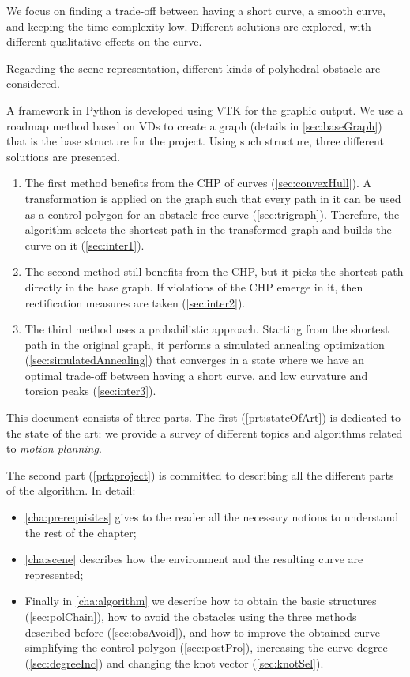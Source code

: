 \documentclass[dissertation.tex]{subfiles}
\begin{document}
We focus on finding a trade-off between having a short curve, a
smooth curve, and keeping the time complexity low.
Different solutions are explored, with different qualitative effects
on the curve.

Regarding the scene representation, different kinds of
polyhedral obstacle are considered.

A framework in Python is developed using \acf{VTK} for the graphic
output. We use a roadmap method based on \acfp{VD} to create a
graph (details in
\cref{sec:baseGraph}) that is the base
structure for the project. Using such structure, three
different solutions are presented.
\begin{enumerate}
\item The first method benefits from the \acf{CHP} of \bs
  curves (\cref{sec:convexHull}). A transformation is applied on the
  graph such that every path in it can be used as a control polygon
  for an obstacle-free curve (\cref{sec:trigraph}). Therefore, the
  algorithm selects the shortest path in the transformed graph and
  builds the curve on it (\cref{sec:inter1}).
\item The second method still benefits from the \ac{CHP},
  but it picks the shortest path directly in the base graph. If
  violations of the \ac{CHP} emerge in it, then rectification
  measures are taken (\cref{sec:inter2}).
\item The third method uses a probabilistic approach. Starting from
  the shortest path in the original graph, it performs a simulated
  annealing optimization (\cref{sec:simulatedAnnealing}) that converges
  in a state where we have an optimal trade-off between having a short curve,
  and low curvature and torsion peaks (\cref{sec:inter3}).
\end{enumerate}

This document consists of three parts. The first
(\cref{prt:stateOfArt})
is dedicated to the state of the art: we provide a survey of
different topics and algorithms related to \emph{motion planning}.

The
second part (\cref{prt:project}) is committed to describing
all the different parts of the algorithm. In detail:
\begin{itemize}
\item \cref{cha:prerequisites} gives to the reader all the necessary notions
  to understand the rest of the chapter;
\item \cref{cha:scene} describes how the
  environment and the resulting curve are represented;
\item Finally in
\cref{cha:algorithm} we describe how to obtain the basic structures
(\cref{sec:polChain}), how to avoid the obstacles using the three
methods described before (\cref{sec:obsAvoid}), and how to improve the
obtained curve simplifying the control polygon (\cref{sec:postPro}),
increasing the curve degree (\cref{sec:degreeInc}) and changing the
\bs knot vector (\cref{sec:knotSel}).
\end{itemize}
\end{document}
